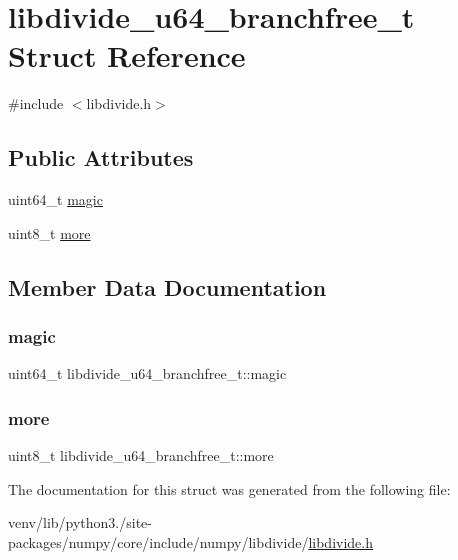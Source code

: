 \hypertarget{structlibdivide__u64__branchfree__t}{}\section{libdivide\+\_\+u64\+\_\+branchfree\+\_\+t Struct Reference}
\label{structlibdivide__u64__branchfree__t}


{\ttfamily \#include $<$libdivide.\+h$>$}

\subsection*{Public Attributes}
\begin{DoxyCompactItemize}
\item 
uint64\+\_\+t \hyperlink{structlibdivide__u64__branchfree__t_ab8c471cd9e9988cb8c47906247eea3f1}{magic}
\item 
uint8\+\_\+t \hyperlink{structlibdivide__u64__branchfree__t_af4c76da4ccaa0f5cfb743d4f90c2c652}{more}
\end{DoxyCompactItemize}


\subsection{Member Data Documentation}
\mbox{\label{structlibdivide__u64__branchfree__t_ab8c471cd9e9988cb8c47906247eea3f1}} 
\subsubsection{\texorpdfstring{magic}{magic}}
{\footnotesize\ttfamily uint64\+\_\+t libdivide\+\_\+u64\+\_\+branchfree\+\_\+t\+::magic}

\mbox{\label{structlibdivide__u64__branchfree__t_af4c76da4ccaa0f5cfb743d4f90c2c652}} 
\subsubsection{\texorpdfstring{more}{more}}
{\footnotesize\ttfamily uint8\+\_\+t libdivide\+\_\+u64\+\_\+branchfree\+\_\+t\+::more}



The documentation for this struct was generated from the following file\+:\begin{DoxyCompactItemize}
\item 
venv/lib/python3./site-\/packages/numpy/core/include/numpy/libdivide/\hyperlink{libdivide_8h}{libdivide.\+h}\end{DoxyCompactItemize}
